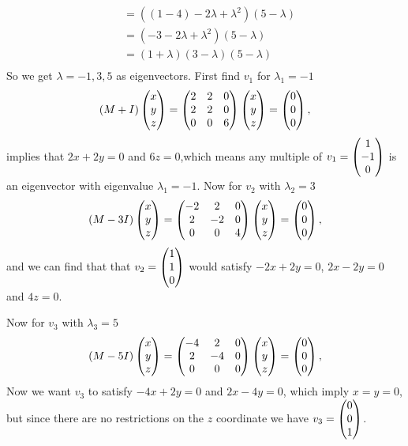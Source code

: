 {\begin{align*}
&=((1-4 )-2\lambda +\lambda^2)(5-\lambda)\\
&=(-3-2\lambda +\lambda^2)(5-\lambda)\\
&=(1+\lambda)(3-\lambda)(5-\lambda)\\
\end{align*}
So we get $\lambda = -1, 3, 5$ as eigenvectors. First find $v_1$ for $\lambda_1 = -1$
\[
(M+I)\begin{pmatrix} x\\y\\z \end{pmatrix}
=
 \begin{pmatrix}
2 &2 & 0 \\
2 & 2& 0 \\
0& 0 & 6 \\
\end{pmatrix}
\begin{pmatrix} x\\y\\z \end{pmatrix}
= \begin{pmatrix} 0\\0\\0 \end{pmatrix},
\]
implies that $2x+2y= 0$ and $6z = 0$,which means any multiple of  $v_1 = \begin{pmatrix} 1\\-1\\0 \end{pmatrix}$ is an eigenvector with eigenvalue $\lambda_1 = -1$.
Now for $v_2$ with $\lambda_2 = 3$
\[
(M-3I)\begin{pmatrix} x\\y\\z \end{pmatrix}
=
 \begin{pmatrix}
-2 &2 & 0 \\
2 & -2& 0 \\
0& 0 & 4 \\
\end{pmatrix}
\begin{pmatrix} x\\y\\z \end{pmatrix}
= \begin{pmatrix} 0\\0\\0 \end{pmatrix},
\]
and we can find that that $v_2 = \begin{pmatrix} 1\\1\\0 \end{pmatrix}$ would satisfy  $-2x+2y= 0$,  $2x-2y= 0$ and $4z = 0$.

Now for $v_3$ with $\lambda_3 = 5$
\[
(M-5I)\begin{pmatrix} x\\y\\z \end{pmatrix}
=
 \begin{pmatrix}
-4 &2 & 0 \\
2 & -4& 0 \\
0& 0 & 0  \\
\end{pmatrix}
\begin{pmatrix} x\\y\\z \end{pmatrix}
= \begin{pmatrix} 0\\0\\0 \end{pmatrix},
\]
Now we want $v_3$ to satisfy $-4 x+ 2y = 0$ and  $2 x-4 y = 0$, which imply $x=y=0$, but since there are no restrictions on the $z$ coordinate we have $v_3 = \begin{pmatrix} 0\\0\\1 \end{pmatrix}$.

}
